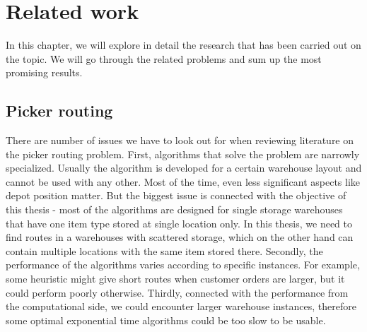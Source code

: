\chapter{Related work}
In this chapter, we will explore in detail the research that has been carried out on the topic. We will go through the related problems and sum up the most promising results.

\section{Picker routing}
There are number of issues we have to look out for when reviewing literature on the picker routing problem. First, algorithms that solve the problem are narrowly specialized. Usually the algorithm is developed for a certain warehouse layout and cannot be used with any other. Most of the time, even less significant aspects like depot position matter. But the biggest issue is connected with the objective of this thesis - most of the algorithms are designed for single storage warehouses that have one item type stored at single location only. In this thesis, we need to find routes in a warehouses with scattered storage, which on the other hand can contain multiple locations with the same item stored there. Secondly, the performance of the algorithms varies according to specific instances. For example, some heuristic might give short routes when customer orders are larger, but it could perform poorly otherwise. Thirdly, connected with the performance from the computational side, we could encounter larger warehouse instances, therefore some optimal exponential time algorithms could be too slow to be usable.



